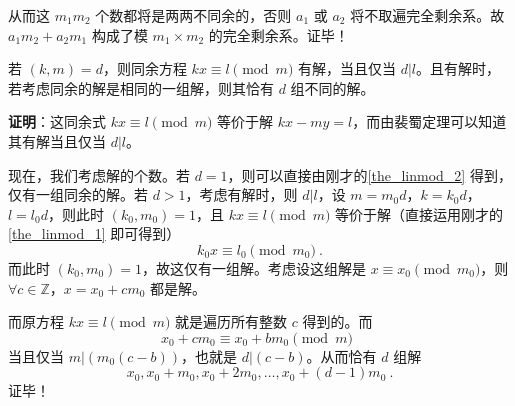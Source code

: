 从而这 $m_1m_2$ 个数都将是两两不同余的，否则 $a_1$ 或 $a_2$ 将不取遍完全剩余系。故 $a_1m_2+a_2m_1$ 构成了模 $m_1\times m_2$ 的完全剩余系。证毕！


\begin{theorem}{}
若 $(k, m) = d$，则同余方程 $kx \equiv l \pmod m$ 有解，当且仅当 $d | l$。且有解时，若考虑同余的解是相同的一组解，则其恰有 $d$ 组不同的解。
\end{theorem}
\textbf{证明}：这同余式 $kx \equiv l \pmod m$ 等价于解 $kx - my = l$，而由裴蜀定理可以知道其有解当且仅当 $d | l$。

现在，我们考虑解的个数。若 $d=1$，则可以直接由刚才的\autoref{the_linmod_2} 得到，仅有一组同余的解。若 $d > 1$，考虑有解时，则 $d|l$，设 $m = m_0 d$，$k = k_0 d$，$l = l_0 d$，则此时 $(k_0, m_0) = 1$，且 $kx \equiv l \pmod m$ 等价于解（直接运用刚才的\autoref{the_linmod_1} 即可得到）
\begin{equation}
k_0 x \equiv l_0 \pmod {m_0} ~.
\end{equation}
而此时 $(k_0, m_0) = 1$，故这仅有一组解。考虑设这组解是 $x \equiv x_0 \pmod {m_0}$，则 $\forall c \in \mathbb Z$，$x = x_0 + c m_0$ 都是解。

而原方程 $kx \equiv l \pmod m$ 就是遍历所有整数 $c$ 得到的。而
\begin{equation}
x_0 + c m_0 \equiv x_0 + b m_0 \pmod m ~~
\end{equation}
当且仅当 $m | (m_0 (c - b))$，也就是 $d | (c - b)$。从而恰有 $d$ 组解
\begin{equation}
x_0, x_0 + m_0, x_0 + 2 m_0, \dots, x_0 + (d-1) m_0 ~.
\end{equation}
证毕！